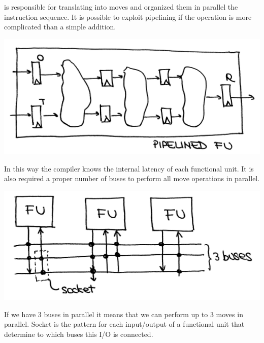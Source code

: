 is responsible for translating into moves and organized them in parallel the
instruction sequence. It is possible to exploit pipelining if the operation is
more complicated than a simple addition.
\begin{center}
  \includegraphics[width=0.7\linewidth]{img/img3/8}
\end{center}
In this way the compiler knows the internal latency of each functional unit. It
is also required a proper number of buses to perform all move operations in
parallel.
\begin{center}
  \includegraphics[width=0.7\linewidth]{img/img3/9}
\end{center}
If we have 3 buses in parallel it means that we can perform up to 3 moves in
parallel. Socket is the pattern for each input/output of a functional unit that
determine to which buses this I/O is connected.

